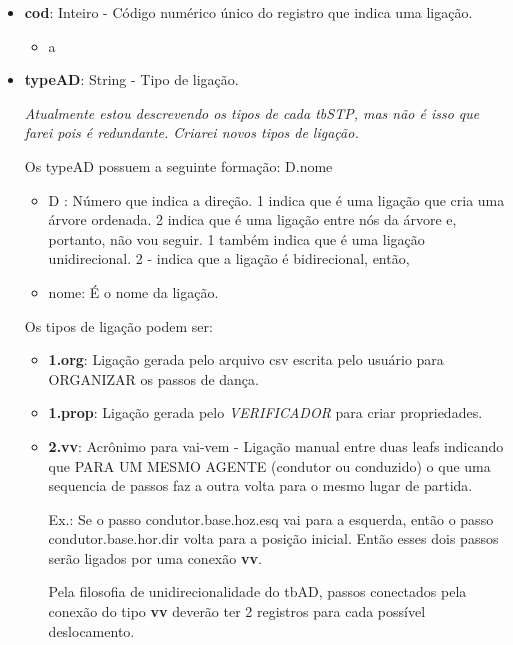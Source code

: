 \begin{itemize}
	\item \textbf{cod}: Inteiro - Código numérico único do registro que indica uma ligação.
			\begin{itemize}
				\item a
			\end{itemize}

	\item \textbf{typeAD}: String - Tipo de ligação.


\emph{Atualmente estou descrevendo os tipos de cada tbSTP, mas não é isso que farei pois é redundante. Criarei novos tipos de ligação.}

Os typeAD possuem a seguinte formação: D.nome

\begin{itemize}
	\item D : Número que indica a direção. 1 indica que é uma ligação que cria uma árvore ordenada. 2 indica que é uma ligação entre nós da árvore e, portanto, não vou seguir. 1 também indica que é uma ligação unidirecional. 2 - indica que a ligação é bidirecional, então,
	
	\item nome: É o nome da ligação.
	
\end{itemize}


Os tipos de ligação podem ser:


			\begin{itemize}
				\item \textbf{1.org}: Ligação gerada pelo arquivo csv escrita pelo usuário para ORGANIZAR os passos de dança.
				\item \textbf{1.prop}: Ligação gerada pelo \emph{VERIFICADOR} para criar propriedades.

				\item \textbf{2.vv}: Acrônimo para vai-vem - Ligação manual entre duas leafs indicando que PARA UM MESMO AGENTE (condutor ou conduzido) o que uma sequencia de passos faz a outra volta para o mesmo lugar de partida. 
				
				Ex.: Se o passo condutor.base.hoz.esq vai para a esquerda, então o passo condutor.base.hor.dir volta para a posição inicial. Então esses dois passos serão ligados por uma conexão \textbf{vv}. 
				
				Pela filosofia de unidirecionalidade do tbAD, passos conectados pela conexão do tipo \textbf{vv} deverão ter 2 registros para cada possível deslocamento.
			

\end{itemize}
\end{itemize}

